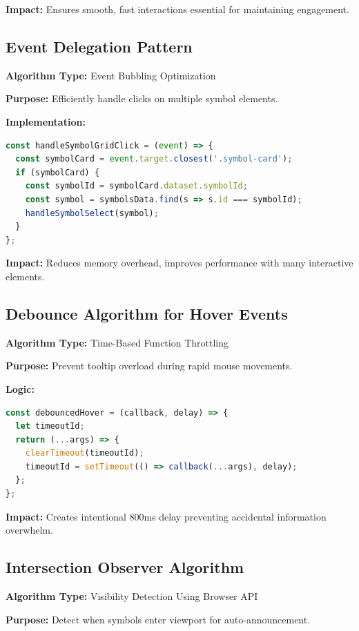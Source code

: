 \documentclass[11pt, a4paper]{article}
\begin{document}
\textbf{Impact:} Ensures smooth, fast interactions essential for maintaining engagement.

\subsection{Event Delegation Pattern}

\textbf{Algorithm Type:} Event Bubbling Optimization

\textbf{Purpose:} Efficiently handle clicks on multiple symbol elements.

\textbf{Implementation:}
\begin{lstlisting}[language=JavaScript]
const handleSymbolGridClick = (event) => {
  const symbolCard = event.target.closest('.symbol-card');
  if (symbolCard) {
    const symbolId = symbolCard.dataset.symbolId;
    const symbol = symbolsData.find(s => s.id === symbolId);
    handleSymbolSelect(symbol);
  }
};
\end{lstlisting}

\textbf{Impact:} Reduces memory overhead, improves performance with many interactive elements.

\subsection{Debounce Algorithm for Hover Events}

\textbf{Algorithm Type:} Time-Based Function Throttling

\textbf{Purpose:} Prevent tooltip overload during rapid mouse movements.

\textbf{Logic:}
\begin{lstlisting}[language=JavaScript]
const debouncedHover = (callback, delay) => {
  let timeoutId;
  return (...args) => {
    clearTimeout(timeoutId);
    timeoutId = setTimeout(() => callback(...args), delay);
  };
};
\end{lstlisting}

\textbf{Impact:} Creates intentional 800ms delay preventing accidental information overwhelm.

\subsection{Intersection Observer Algorithm}

\textbf{Algorithm Type:} Visibility Detection Using Browser API

\textbf{Purpose:} Detect when symbols enter viewport for auto-announcement.
\end{document}
